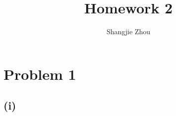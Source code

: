 \documentclass{article}
\title{Homework 2}
\author{Shangjie Zhou}
\begin{document}
\maketitle


\section*{Problem 1}
\subsection*{(i)}

%
%
\end{document}
